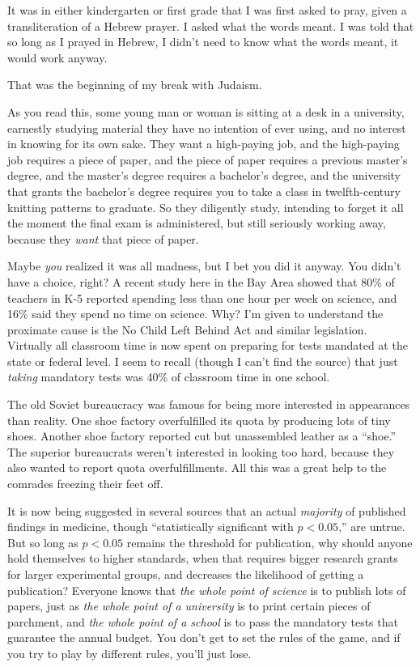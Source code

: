 \myendsectiontext


\bigskip


{
 It was in either kindergarten or first grade that I was first
asked to pray, given a transliteration of a Hebrew prayer. I asked what
the words meant. I was told that so long as I prayed in Hebrew, I
didn't need to know what the words meant, it would work
anyway. }

{
 That was the beginning of my break with Judaism.}

{
 As you read this, some young man or woman is sitting at a desk in
a university, earnestly studying material they have no intention of
ever using, and no interest in knowing for its own sake. They want a
high-paying job, and the high-paying job requires a piece of paper, and
the piece of paper requires a previous master's degree,
and the master's degree requires a
bachelor's degree, and the university that grants the
bachelor's degree requires you to take a class in
twelfth-century knitting patterns to graduate. So they diligently
study, intending to forget it all the moment the final exam is
administered, but still seriously working away, because they
\textit{want} that piece of paper.}

{
 Maybe \textit{you} realized it was all madness, but I bet you did
it anyway. You didn't have a choice, right? A recent
study here in the Bay Area showed that 80\% of teachers in K-5 reported
spending less than one hour per week on science, and 16\% said they
spend no time on science. Why? I'm given to understand
the proximate cause is the No Child Left Behind Act and similar
legislation. Virtually all classroom time is now spent on preparing for
tests mandated at the state or federal level. I seem to recall (though
I can't find the source) that just \textit{taking}
mandatory tests was 40\% of classroom time in one school.}

{
 The old Soviet bureaucracy was famous for being more interested in
appearances than reality. One shoe factory overfulfilled its quota by
producing lots of tiny shoes. Another shoe factory reported cut but
unassembled leather as a ``shoe.''
The superior bureaucrats weren't interested in looking
too hard, because they also wanted to report quota overfulfillments.
All this was a great help to the comrades freezing their feet off.}

{
 It is now being suggested in several sources that an actual
\textit{majority} of published findings in medicine, though
``statistically significant with $p < 0.05$,'' are untrue.
But so long as $p < 0.05$
remains the threshold for publication, why should anyone hold
themselves to higher standards, when that requires bigger research
grants for larger experimental groups, and decreases the likelihood of
getting a publication? Everyone knows that \textit{the whole point of
science} is to publish lots of papers, just as \textit{the whole point
of a university} is to print certain pieces of parchment, and
\textit{the whole point of a school} is to pass the mandatory tests
that guarantee the annual budget. You don't get to set
the rules of the game, and if you try to play by different rules,
you'll just lose.}

